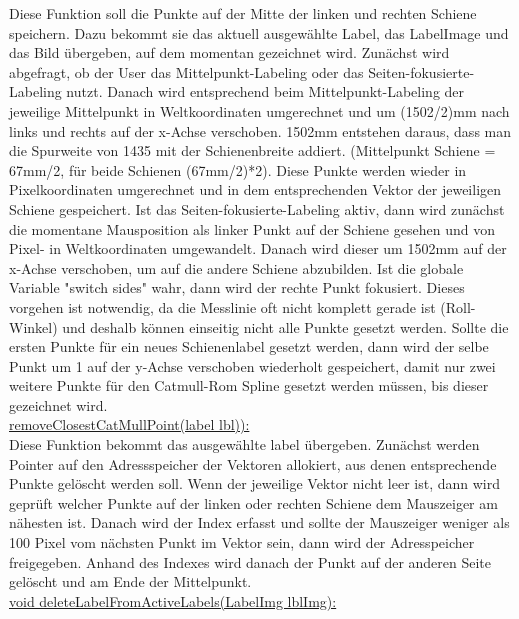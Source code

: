 \documentclass[11pt]{scrartcl}
\begin{document}
\noindent
Diese Funktion soll die Punkte auf der Mitte der linken und rechten Schiene speichern. Dazu bekommt sie das aktuell ausgewählte Label, das LabelImage und das Bild übergeben, auf dem momentan gezeichnet wird. Zunächst wird abgefragt, ob der User das Mittelpunkt-Labeling oder das Seiten-fokusierte-Labeling nutzt. Danach wird entsprechend beim Mittelpunkt-Labeling der jeweilige Mittelpunkt in Weltkoordinaten umgerechnet und um (1502/2)mm nach links und rechts auf der x-Achse verschoben. 1502mm entstehen daraus, dass man die Spurweite von 1435 mit der Schienenbreite addiert. (Mittelpunkt Schiene = 67mm/2, für beide Schienen (67mm/2)*2). Diese Punkte werden wieder in Pixelkoordinaten umgerechnet und in dem entsprechenden Vektor der jeweiligen Schiene gespeichert. Ist das Seiten-fokusierte-Labeling aktiv, dann wird zunächst die momentane Mausposition als linker Punkt auf der Schiene gesehen und von Pixel- in Weltkoordinaten umgewandelt. Danach wird dieser um 1502mm auf der x-Achse verschoben, um auf die andere Schiene abzubilden. Ist die globale Variable "switch sides" wahr, dann wird der rechte Punkt fokusiert. Dieses vorgehen ist notwendig, da die Messlinie oft nicht komplett gerade ist (Roll-Winkel) und deshalb können einseitig nicht alle Punkte gesetzt werden. Sollte die ersten Punkte für ein neues Schienenlabel gesetzt werden, dann wird der selbe Punkt um 1 auf der y-Achse verschoben wiederholt gespeichert, damit nur zwei weitere Punkte für den Catmull-Rom Spline gesetzt werden müssen, bis dieser gezeichnet wird. 
\\

\noindent
\underline{removeClosestCatMullPoint(label lbl)):}
\\

\noindent
Diese Funktion bekommt das ausgewählte label übergeben. Zunächst werden Pointer auf den Adressspeicher der Vektoren allokiert, aus denen entsprechende Punkte gelöscht werden soll. Wenn der jeweilige Vektor nicht leer ist, dann wird geprüft welcher Punkte auf der linken oder rechten Schiene dem Mauszeiger am nähesten ist. Danach wird der Index erfasst und sollte der Mauszeiger weniger als 100 Pixel vom nächsten Punkt im Vektor sein, dann wird der Adresspeicher freigegeben. Anhand des Indexes wird danach der Punkt auf der anderen Seite gelöscht und am Ende der Mittelpunkt.
\\

\noindent
\underline{void deleteLabelFromActiveLabels(LabelImg lblImg):}
\\
\end{document}
